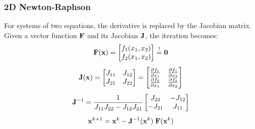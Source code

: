 \subsubsection{2D Newton-Raphson}
For systems of two equations, the derivative is replaced by the Jacobian matrix. Given a vector function $\vb F$ and its Jacobian $\vb J$, the iteration becomes:
\begin{equation}
\begin{gathered}
    \vb F(\vb x) = \begin{bmatrix} f_1(x_1, x_2) \\ f_2(x_1, x_2) \end{bmatrix} \stackrel{!}{=} \vb 0
    \\[1ex]
    \vb J(\vb x) = \begin{bmatrix} J_{11} & J_{12} \\ J_{21} & J_{22} \end{bmatrix} = \begin{bmatrix} \pdv{f_1}{x_1} & \pdv{f_1}{x_2} \\ \pdv{f_2}{x_1} & \pdv{f_2}{x_2} \end{bmatrix}
    \\[1ex]
    \vb J^{-1} = \frac{1}{J_{11}J_{22} - J_{12}J_{21}} \begin{bmatrix}J_{22} & - J_{12} \\ -J_{21} & J_{11}\end{bmatrix}
    \\[1ex]
\vb x^{k+1} = \vb x^k - \vb J^{-1}(\vb x^k)\;\vb F(\vb x^k)
\end{gathered}
\label{eq:2D_newton_raphson}
\end{equation}
